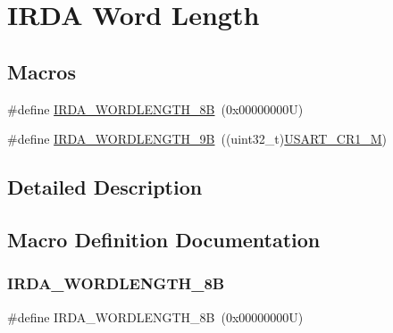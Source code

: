 \hypertarget{group___i_r_d_a_ex___word___length}{}\section{I\+R\+DA Word Length}
\label{group___i_r_d_a_ex___word___length}
\subsection*{Macros}
\begin{DoxyCompactItemize}
\item 
\#define \hyperlink{group___i_r_d_a_ex___word___length_ga53b28028ae932349fcc40190dd8d7c9a}{I\+R\+D\+A\+\_\+\+W\+O\+R\+D\+L\+E\+N\+G\+T\+H\+\_\+8B}~(0x00000000\+U)
\item 
\#define \hyperlink{group___i_r_d_a_ex___word___length_gad005e4d28476758d4e5b56a3d98f7cd4}{I\+R\+D\+A\+\_\+\+W\+O\+R\+D\+L\+E\+N\+G\+T\+H\+\_\+9B}~((uint32\+\_\+t)\hyperlink{group___peripheral___registers___bits___definition_ga95f0288b9c6aaeca7cb6550a2e6833e2}{U\+S\+A\+R\+T\+\_\+\+C\+R1\+\_\+M})
\end{DoxyCompactItemize}


\subsection{Detailed Description}


\subsection{Macro Definition Documentation}
\mbox{\label{group___i_r_d_a_ex___word___length_ga53b28028ae932349fcc40190dd8d7c9a}} 
\subsubsection{\texorpdfstring{I\+R\+D\+A\+\_\+\+W\+O\+R\+D\+L\+E\+N\+G\+T\+H\+\_\+8B}{IRDA\_WORDLENGTH\_8B}}
{\footnotesize\ttfamily \#define I\+R\+D\+A\+\_\+\+W\+O\+R\+D\+L\+E\+N\+G\+T\+H\+\_\+8B~(0x00000000\+U)}


